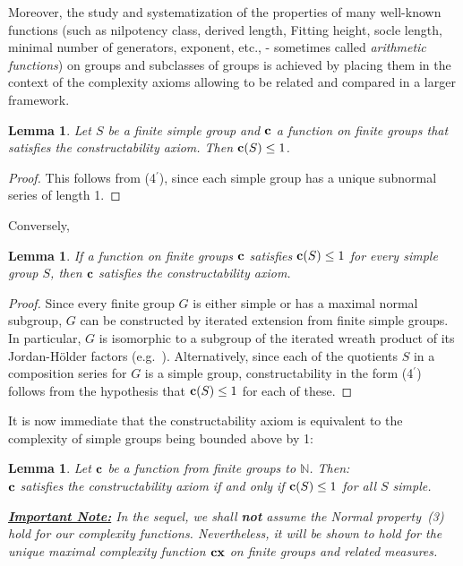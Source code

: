 \documentclass[a4paper,11pt]{amsart}
\newtheorem{lemma}[theorem]{Lemma}
\theoremstyle{definition}
\newcommand{\cx}{\mbox{\bf cx}}
\renewcommand{\c}{\mbox{\bf c}}
\newcommand{\N}{\mathbb{N}}
\newcommand{\1}{{\mathbf 1}}
\begin{document}
Moreover, the study and systematization of the properties of many well-known functions (such as nilpotency class,  derived length, Fitting height, socle length, minimal number of generators, exponent,  etc., - sometimes called {\em arithmetic functions}) on groups and subclasses of groups is achieved by placing them in the context of the  complexity axioms allowing  to be related and compared in a larger framework. 




\begin{lemma}\label{simplecpx}
Let $S$ be a finite simple group and $\c$
 a function on finite groups that satisfies the constructability axiom. 
 Then $\c(S)\leq 1$. 
 \end{lemma}
 \begin{proof} This follows from (4$^\prime$), since each simple group has a unique subnormal series of length 1. \end{proof}
Conversely, 
\begin{lemma}\label{constru->simple1}
If a function on finite groups $\c$ satisfies $\c(S)\leq 1$ for every simple group $S$, then
$\c$ satisfies the constructability axiom. 
\end{lemma} \begin{proof} 
Since every finite group $G$ is either simple or has a maximal normal subgroup, $G$ can be constructed by iterated extension from finite simple groups.  In particular, $G$ is isomorphic to a subgroup of the iterated wreath product of its Jordan-H\"older factors (e.g.\ \cite[Theorem 1.17]{AutomataNetworks}). Alternatively, since each of the quotients  $S$ in a composition series for $G$ is a simple group,
constructability in the form (4$^\prime$) follows from the hypothesis that $\c(S)\leq 1$ for each of these. \end{proof}
It is now immediate that 
the constructability axiom is equivalent to the complexity of simple groups being bounded above by 1:
\begin{lemma}\label{construct-simple}
Let $\c$ be a function from finite groups to $\N$.  Then:\\
$\c$ satisfies  the constructability axiom if and only if $\c(S)\leq 1$ for all $S$ simple. 
\end{lemma}

\noindent
{\em{\underline{\bf Important Note:}} In the sequel, we shall \textbf{not} assume the Normal property~(3) hold for our complexity functions. Nevertheless, it will be shown to hold for the unique maximal complexity function $\cx$ on finite groups and related measures. }
\end{document}
